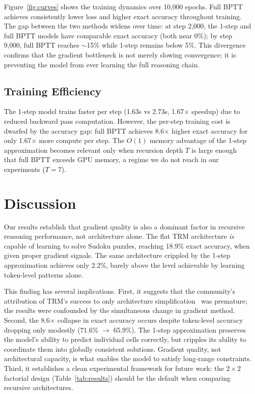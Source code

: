 \documentclass{article}
\begin{document}
Figure~\ref{fig:curves} shows the training dynamics over 10,000 epochs. Full BPTT achieves consistently lower loss and higher exact accuracy throughout training. The gap between the two methods widens over time: at step 2,000, the 1-step and full BPTT models have comparable exact accuracy (both near 0\%); by step 9,000, full BPTT reaches $\sim$15\% while 1-step remains below 5\%. This divergence confirms that the gradient bottleneck is not merely slowing convergence; it is preventing the model from ever learning the full reasoning chain.

\subsection{Training Efficiency}

The 1-step model trains faster per step (1.63s vs 2.73s, 1.67$\times$ speedup) due to reduced backward pass computation. However, the per-step training cost is dwarfed by the accuracy gap: full BPTT achieves 8.6$\times$ higher exact accuracy for only 1.67$\times$ more compute per step. The $O(1)$ memory advantage of the 1-step approximation becomes relevant only when recursion depth $T$ is large enough that full BPTT exceeds GPU memory, a regime we do not reach in our experiments ($T=7$).

\section{Discussion}

Our results establish that gradient quality is also a dominant factor in recursive reasoning performance, not architecture alone. The flat TRM architecture \emph{is} capable of learning to solve Sudoku puzzles, reaching 18.9\% exact accuracy, when given proper gradient signals. The same architecture crippled by the 1-step approximation achieves only 2.2\%, barely above the level achievable by learning token-level patterns alone.

This finding has several implications. First, it suggests that the community's attribution of TRM's success to only architecture simplification~\cite{arcprize2025} was premature; the results were confounded by the simultaneous change in gradient method. Second, the 8.6$\times$ collapse in exact accuracy occurs despite token-level accuracy dropping only modestly (71.6\% $\rightarrow$ 65.9\%). The 1-step approximation preserves the model's ability to predict individual cells correctly, but cripples its ability to coordinate them into globally consistent solutions. Gradient quality, not architectural capacity, is what enables the model to satisfy long-range constraints. Third, it establishes a clean experimental framework for future work: the $2\times2$ factorial design (Table~\ref{tab:results}) should be the default when comparing recursive architectures.
\end{document}
